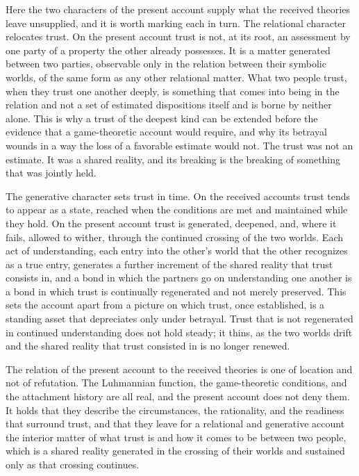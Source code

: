 Here the two characters of the present account supply what the received theories leave unsupplied, and it is worth marking each in turn. The relational character relocates trust. On the present account trust is not, at its root, an assessment by one party of a property the other already possesses. It is a matter generated between two parties, observable only in the relation between their symbolic worlds, of the same form as any other relational matter. What two people trust, when they trust one another deeply, is something that comes into being in the relation and not a set of estimated dispositions itself and is borne by neither alone. This is why a trust of the deepest kind can be extended before the evidence that a game-theoretic account would require, and why its betrayal wounds in a way the loss of a favorable estimate would not. The trust was not an estimate. It was a shared reality, and its breaking is the breaking of something that was jointly held.

The generative character sets trust in time. On the received accounts trust tends to appear as a state, reached when the conditions are met and maintained while they hold. On the present account trust is generated, deepened, and, where it fails, allowed to wither, through the continued crossing of the two worlds. Each act of understanding, each entry into the other's world that the other recognizes as a true entry, generates a further increment of the shared reality that trust consists in, and a bond in which the partners go on understanding one another is a bond in which trust is continually regenerated and not merely preserved. This sets the account apart from a picture on which trust, once established, is a standing asset that depreciates only under betrayal. Trust that is not regenerated in continued understanding does not hold steady; it thins, as the two worlds drift and the shared reality that trust consisted in is no longer renewed.

The relation of the present account to the received theories is one of location and not of refutation. The Luhmannian function, the game-theoretic conditions, and the attachment history are all real, and the present account does not deny them. It holds that they describe the circumstances, the rationality, and the readiness that surround trust, and that they leave for a relational and generative account the interior matter of what trust is and how it comes to be between two people, which is a shared reality generated in the crossing of their worlds and sustained only as that crossing continues.
